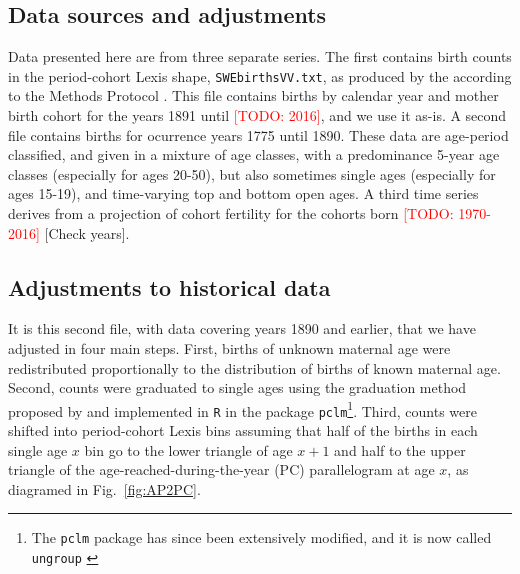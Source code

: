 \documentclass{article}
\renewcommand{\todo}[1]{\textcolor{red}{[TODO: #1]}}
\begin{document}
\FloatBarrier
\begin{appendix}
\section{Data sources and adjustments}
\label{sec:dataprep}
Data presented here are from three separate series. The first
contains birth counts in the period-cohort Lexis shape,
\texttt{SWEbirthsVV.txt}, as produced by the \citet{HFD} according to the Methods
Protocol \citep{hfd2015methods}. This file contains births by calendar year and
mother birth cohort for the years 1891 until \todo{2016}, and we use it as-is. A
second file contains births for ocurrence years 1775 until 1890. These data are
age-period classified, and given in a mixture of age classes, with a
predominance 5-year age classes (especially for ages 20-50), but also sometimes
single ages (especially for ages 15-19), and time-varying top and bottom open
ages. A third time series derives from a projection of cohort fertility for the cohorts born \todo{1970-2016} [Check years].

\subsection{Adjustments to historical data}
It is this second file, with data covering years 1890 and earlier, that we have
adjusted in four main steps. First, births of unknown maternal age were redistributed proportionally to the distribution of births of known maternal age. Second, counts were graduated to single ages using the graduation method proposed by \citet{rizzi2015efficient} and implemented in \texttt{R} in the package \texttt{pclm}\footnote{The \texttt{pclm} package has since been extensively modified, and it is now called \texttt{ungroup} \citep{pclmR}}. Third, counts were shifted into period-cohort Lexis bins assuming that half of the births in each single age $x$ bin go to the lower triangle of age $x+1$ and half to the upper triangle of the age-reached-during-the-year (PC) parallelogram at age $x$, as diagramed in Fig.~\ref{fig:AP2PC}.


\end{appendix}
\end{document}

